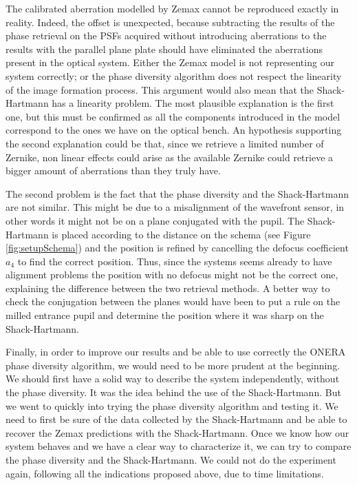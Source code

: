 The calibrated aberration modelled by Zemax cannot be reproduced exactly in reality. Indeed, the offset is unexpected, because subtracting the results of the phase retrieval on the PSFs acquired without introducing aberrations to the results with the parallel plane plate should have eliminated the aberrations present in the optical system.  Either the Zemax model is not representing our system correctly; or the phase diversity algorithm does not respect the linearity of the image formation process. This argument would also mean that the Shack-Hartmann has a linearity problem. The most plausible explanation is the first one, but this must be confirmed as all the components introduced in the model correspond to the ones we have on the optical bench. An hypothesis supporting the second explanation could be that, since we retrieve a limited number of Zernike, non linear effects could arise as the available Zernike could retrieve a bigger amount of aberrations than they truly have.

The second problem is the fact that the phase diversity and the Shack-Hartmann are not similar. This might be due to a misalignment of the wavefront sensor, in other words it might not be on a plane conjugated with the pupil. The Shack-Hartmann is placed according to the distance on the schema (see Figure \ref{fig:setupSchema}) and the position is refined by cancelling the defocus coefficient $a_4$ to find the correct position. Thus, since the systems seems already to have alignment problems the position with no defocus might not be the correct one, explaining the difference between the two retrieval methods. A better way to check the conjugation between the planes would have been to put a rule on the milled entrance pupil and determine the position where it was sharp on the Shack-Hartmann. 

Finally, in order to improve our results and be able to use correctly the ONERA phase diversity algorithm, we would need to be more prudent at the beginning. We should first have a solid way to describe the system independently, without the phase diversity. It was the idea behind the use of the Shack-Hartmann. But we went to quickly into trying the phase diversity algorithm and testing it. We need to first be sure of the data collected by the Shack-Hartmann and be able to recover the Zemax predictions with the Shack-Hartmann. Once we know how our system behaves and we have a clear way to characterize it, we can try to compare the phase diversity and the Shack-Hartmann. We could not do the experiment again, following all the indications proposed above, due to time limitations.